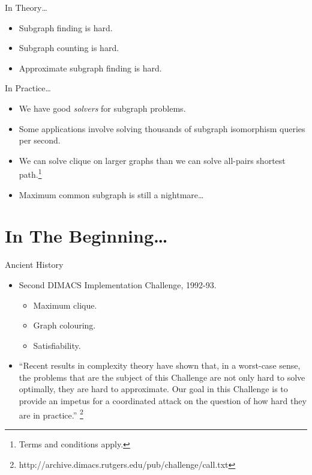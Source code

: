 \documentclass[aspectratio=169,compress,10pt]{beamer}
\begin{document}
\begin{frame}{In Theory\ldots}
    \begin{itemize}
        \item Subgraph finding is hard.
        \item Subgraph counting is hard.
        \item Approximate subgraph finding is hard.
    \end{itemize}
\end{frame}

\begin{frame}{In Practice\ldots}
    \begin{itemize}
        \item We have good \emph{solvers} for subgraph problems.
        \item Some applications involve solving thousands of subgraph isomorphism queries per second.
        \item We can solve clique on larger graphs than we can solve all-pairs
            shortest path.\footnote{Terms and conditions apply.}
        \item<2-> Maximum common subgraph is still a nightmare\ldots
    \end{itemize}
\end{frame}

\section{In The Beginning\ldots}

\begin{frame}{Ancient History}
    \begin{itemize}
        \item Second DIMACS Implementation Challenge, 1992-93.
            \begin{itemize}
                \item Maximum clique.
                \item Graph colouring.
                \item Satisfiability.
            \end{itemize}
        \item ``Recent results in complexity theory have shown that, in a worst-case sense, the
            problems that are the subject of this Challenge are not only hard to solve optimally,
            they are hard to approximate.  Our goal in this Challenge is to provide an impetus for a
            coordinated attack on the question of how hard they are in practice.''
            \footnote{http://archive.dimacs.rutgers.edu/pub/challenge/call.txt}
    \end{itemize}
\end{frame}
\end{document}
